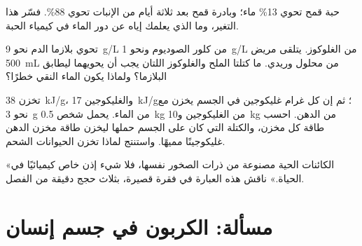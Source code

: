\begin{exercise}[$\star\star\star$]\label{exo:g10:chemistry-of-life:12}
حبة قمح تحوي 13\% ماء؛ وبادرة قمح بعد ثلاثة أيام من الإنبات تحوي
88\%. فسّر هذا التغير، وما الذي يعلمك إياه عن دور الماء في كيمياء
الحبة.
\end{exercise}

\begin{exercise}[$\star\star\star$]\label{exo:g10:chemistry-of-life:13}
تحوي بلازما الدم نحو \qty{9}{g/L} من كلور الصوديوم ونحو \qty{1}{g/L}
من الغلوكوز. يتلقى مريض \qty{500}{mL} من محلول وريدي. ما كتلتا الملح
والغلوكوز اللتان يجب أن يحويهما ليطابق البلازما؟ ولماذا يكون الماء
النقي خطرًا؟
\end{exercise}

\begin{exercise}[$\star\star\star$]\label{exo:g10:chemistry-of-life:14}
تخزن  \qty{38}{kJ/g}، والغليكوجين \qty{17}{kJ/g}؛ ثم إن كل غرام
غليكوجين في الجسم يخزن مع نحو \qty{3}{g} من الماء. يحمل شخص
\qty{0.5}{kg} من الغليكوجين و\qty{10}{kg} من الدهن. احسب طاقة كل
مخزن، والكتلة التي كان على الجسم حملها ليخزن طاقة مخزن الدهن غليكوجينًا
مميهًا. واستنتج لماذا تخزن الحيوانات الشحم.
\end{exercise}

\begin{exercise}[$\star\star\star$]\label{exo:g10:chemistry-of-life:15}
«الكائنات الحية مصنوعة من ذرات الصخور نفسها، فلا شيء إذن خاص كيميائيًا
في الحياة.» ناقش هذه العبارة في فقرة قصيرة، بثلاث حجج دقيقة من الفصل.
\end{exercise}

\section{مسألة: الكربون في جسم إنسان}

